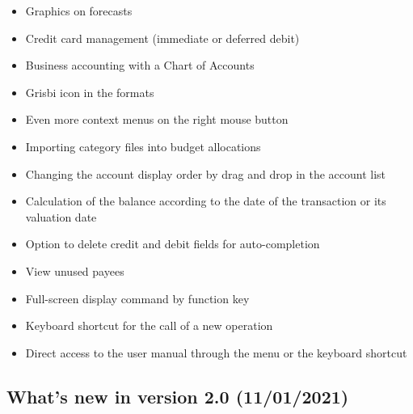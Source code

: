 \begin{itemize}%
	\item Graphics on forecasts
	\item Credit card management (immediate or deferred debit)
	\item Business accounting with a Chart of Accounts
	\item Grisbi icon in the  formats 
	\item Even more context menus on the right mouse button
	\item Importing category files into budget allocations
	\item Changing the account display order by drag and drop in the account list
	\item Calculation of the balance according to the date of the transaction or its valuation date
	\item Option to delete credit and debit fields for auto-completion
	\item View unused payees
	\item Full-screen display command by function key 
	\item Keyboard shortcut  for the call of a new operation
	\item Direct access to the user manual through the menu  or the keyboard shortcut 
\end{itemize}

\subsection{What's new in version 2.0 \textnormal{(11/01/2021)}}

